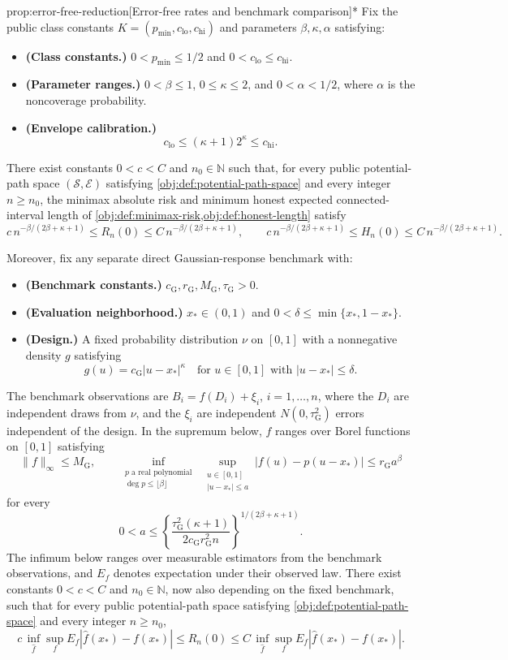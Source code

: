 \documentclass[11pt]{article}
\begin{document}
\begin{propositionv}{prop:error-free-reduction}[Error-free rates and benchmark comparison]*
Fix the public class constants \(K=(p_{\min},c_{\mathrm{lo}},c_{\mathrm{hi}})\) and parameters \(\beta,\kappa,\alpha\) satisfying:
\begin{itemize}
\item \textbf{(Class constants.)} \(0<p_{\min}\le 1/2\) and \(0<c_{\mathrm{lo}}\le c_{\mathrm{hi}}\).
\item \textbf{(Parameter ranges.)} \(0<\beta\le1\), \(0\le\kappa\le2\), and \(0<\alpha<1/2\), where \(\alpha\) is the noncoverage probability.
\item \textbf{(Envelope calibration.)}
\[
c_{\mathrm{lo}}\le(\kappa+1)2^\kappa\le c_{\mathrm{hi}}.
\]
\end{itemize}
There exist constants \(0<c<C\) and \(n_0\in\mathbb N\) such that, for every public potential-path space \((\mathcal S,\mathcal E)\) satisfying \cref{obj:def:potential-path-space} and every integer \(n\ge n_0\), the minimax absolute risk and minimum honest expected connected-interval length of \cref{obj:def:minimax-risk,obj:def:honest-length} satisfy
\[
c\,n^{-\beta/(2\beta+\kappa+1)}
\le R_n(0)\le
C\,n^{-\beta/(2\beta+\kappa+1)},
\qquad
c\,n^{-\beta/(2\beta+\kappa+1)}
\le H_n(0)\le
C\,n^{-\beta/(2\beta+\kappa+1)}.
\]

Moreover, fix any separate direct Gaussian-response benchmark with:
\begin{itemize}
\item \textbf{(Benchmark constants.)} \(c_{\mathrm G},r_{\mathrm G},M_{\mathrm G},\tau_{\mathrm G}>0\).
\item \textbf{(Evaluation neighborhood.)} \(x_*\in(0,1)\) and \(0<\delta\le\min\{x_*,1-x_*\}\).
\item \textbf{(Design.)} A fixed probability distribution \(\nu\) on \([0,1]\) with a nonnegative density \(g\) satisfying
\[
g(u)=c_{\mathrm G}|u-x_*|^\kappa
\quad\text{for }u\in[0,1]\text{ with }|u-x_*|\le\delta.
\]
\end{itemize}
The benchmark observations are \(B_i=f(D_i)+\xi_i\), \(i=1,\ldots,n\), where the \(D_i\) are independent draws from \(\nu\), and the \(\xi_i\) are independent \(N(0,\tau_{\mathrm G}^2)\) errors independent of the design. In the supremum below, \(f\) ranges over Borel functions on \([0,1]\) satisfying
\[
\|f\|_\infty\le M_{\mathrm G},
\qquad
\inf_{\substack{p\text{ a real polynomial}\\ \deg p\le\lfloor\beta\rfloor}}
\ \sup_{\substack{u\in[0,1]\\ |u-x_*|\le a}}
|f(u)-p(u-x_*)|
\le r_{\mathrm G}a^\beta
\]
for every
\[
0<a\le
\left\{\frac{\tau_{\mathrm G}^2(\kappa+1)}
{2c_{\mathrm G}r_{\mathrm G}^2n}\right\}^{1/(2\beta+\kappa+1)}.
\]
The infimum below ranges over measurable estimators from the benchmark observations, and \(E_f\) denotes expectation under their observed law. There exist constants \(0<c<C\) and \(n_0\in\mathbb N\), now also depending on the fixed benchmark, such that for every public potential-path space satisfying \cref{obj:def:potential-path-space} and every integer \(n\ge n_0\),
\[
c\,\inf_{\widehat f}\sup_f E_f|\widehat f(x_*)-f(x_*)|
\le R_n(0)\le
C\,\inf_{\widehat f}\sup_f E_f|\widehat f(x_*)-f(x_*)|.
\]
\end{propositionv}
\end{document}

